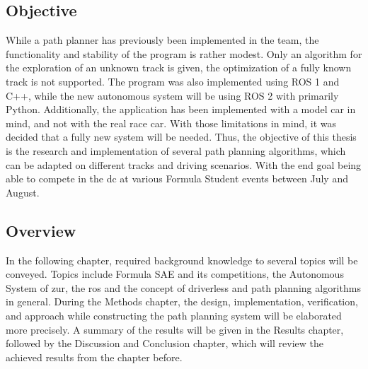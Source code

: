 \subsection{Objective} \label{sec:Objective}
While a path planner has previously been implemented in the team, the functionality and stability of the program is rather modest. Only an algorithm for the exploration of an unknown track is given, the optimization of a fully known track is not supported. The program was also implemented using ROS 1 and C++, while the new autonomous system will be using ROS 2 with primarily Python. Additionally, the application has been implemented with a model car in mind, and not with the real race car. With those limitations in mind, it was decided that a fully new system will be needed. Thus, the objective of this thesis is the research and implementation of several path planning algorithms, which can be adapted on different tracks and driving scenarios. With the end goal being able to compete in the \acrlong{dc} at various Formula Student events between July and August. 

\subsection{Overview} \label{sec:Overview}
In the following chapter, required background knowledge to several topics will be conveyed. Topics include Formula SAE and its competitions, the Autonomous System of \acrlong{zur}, the \acrlong{ros} and the concept of driverless and path planning algorithms in general. During the Methods chapter, the design, implementation, verification, and approach while constructing the path planning system will be elaborated more precisely. A summary of the results will be given in the Results chapter, followed by the Discussion and Conclusion chapter, which will review the achieved results from the chapter before.
